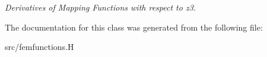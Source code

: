 \begin{DoxyCompactItemize}
\begin{DoxyCompactList}\small\item\em Derivatives of Mapping Functions with respect to z3. \item\end{DoxyCompactList}\end{DoxyCompactItemize}


The documentation for this class was generated from the following file:\begin{DoxyCompactItemize}
\item 
src/femfunctions.H\end{DoxyCompactItemize}

